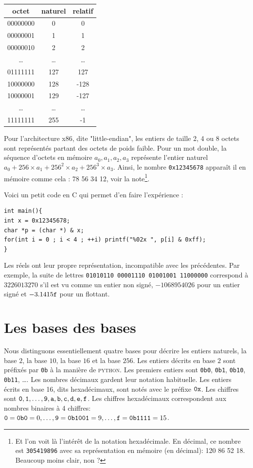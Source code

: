 \documentclass{book}
\newcommand{\python}{\textsc{python}\xspace}
\newcommand{\C}{\textsc{C}\xspace}
\newcommand{\code}[1]{\texttt{#1}}
\newcommand{\hexa}[1]{{\tt #1}}
\newcommand{\bina}[1]{{\tt 0b#1}}
\begin{document}
\begin{center}
	\begin{tabular}{| c | c | c |}
		\hline
		octet & naturel & relatif\\
		\hline
		00000000 & 0 & 0\\
		\hline 00000001 & 1 & 1\\
		\hline 00000010 & 2 & 2\\
		\hline \ldots & \ldots & \ldots\\
		\hline 01111111 & 127 & 127\\
		\hline 10000000 & 128 & -128\\
		\hline 10000001 & 129 & -127\\
		\hline \ldots& \ldots & \ldots\\
		\hline 11111111 & 255 & -1\\
		\hline
	\end{tabular}
\end{center}

Pour l'architecture {\sc x86}, dite "little-endian", les entiers de taille 2, 4 ou 8 octets sont représentés partant des octets de poids faible. Pour un mot double, la séquence d'octets en mémoire $a_0, a_1, a_2, a_3$ représente l'entier naturel $a_0 + 256 \times a_1 + 256^2 \times a_2 + 256^3 \times a_3$. Ainsi, le nombre \code{0x12345678} apparaît il en mémoire comme cela : 
78 56 34 12, voir la note\footnote{Et l'on voit là l'intérêt de la notation hexadécimale. En décimal, ce nombre est \code{305419896} avec sa représentation en mémoire (en décimal): 120 86 52 18. Beaucoup moins clair, non ? }.

Voici un petit code en \C qui permet d'en faire l'expérience :
\begin{verbatim}
int main(){
int x = 0x12345678;
char *p = (char *) & x;
for(int i = 0 ; i < 4 ; ++i) printf("%02x ", p[i] & 0xff);
}
\end{verbatim}

Les réels ont leur propre représentation, incompatible avec les précédentes. Par exemple, la suite de lettres {\tt 01010110\ 00001110\ 01001001\ 11000000} correspond à  $3226013270$ s'il est vu comme un entier non signé, $-1068954026$ pour un entier signé et  $-3.1415{\tt f}$ pour un flottant. 


\section{Les bases des bases}

Nous distinguons essentiellement quatre bases pour décrire les entiers naturels, la base $2$, la base $10$, la base $16$ et la base $256$. Les entiers décrits en base $2$ sont préfixés par {\tt 0b} à la manière de \python. Les premiers entiers sont {\bina{0}, \bina{1}, \bina{10}, \bina{11}, \ldots}.  Les nombres décimaux gardent leur notation habituelle.  Les entiers écrits en base 16, dits hexadécimaux, sont notés avec le préfixe $\tt 0x$. Les chiffres sont $\tt 0, 1, \ldots, 9, a, b, c, d, e, f$. Les chiffres hexadécimaux correspondent aux nombres binaires à 4 chiffres: $\hexa{0} = \bina{0} = 0, \ldots, \hexa{9} = \bina{1001} = 9, \ldots, \hexa{f} = \bina{1111} = 15$. 
\end{document}
